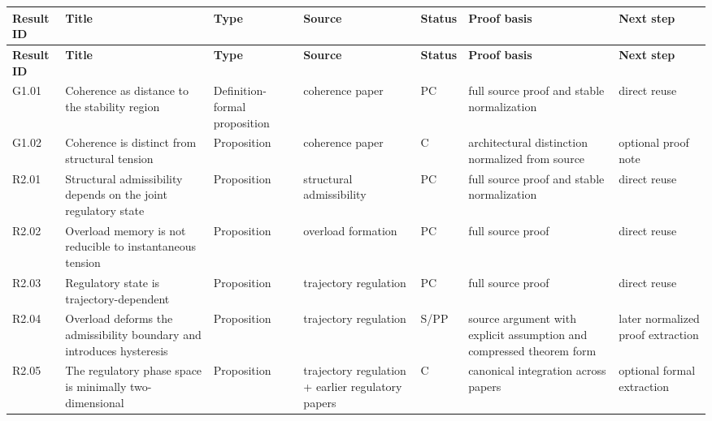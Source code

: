 \documentclass[12pt]{article}
\begin{document}
	\begin{longtable}{>{\RaggedRight\arraybackslash}p{}
			>{\RaggedRight\arraybackslash}p{}
			>{\RaggedRight\arraybackslash}p{}
			>{\RaggedRight\arraybackslash}p{}
			>{\RaggedRight\arraybackslash}p{}
			>{\RaggedRight\arraybackslash}p{}
			>{\RaggedRight\arraybackslash}p{}} 
		\toprule
		\textbf{Result ID} & \textbf{Title} & \textbf{Type} & \textbf{Source} & \textbf{Status} & \textbf{Proof basis} & \textbf{Next step} \\
		\midrule
		\endfirsthead
		\toprule
		\textbf{Result ID} & \textbf{Title} & \textbf{Type} & \textbf{Source} & \textbf{Status} & \textbf{Proof basis} & \textbf{Next step} \\
		\midrule
		\endhead
		
		G1.01 & Coherence as distance to the stability region & Definition-formal proposition & coherence paper & PC & full source proof and stable normalization & direct reuse \\
		
		G1.02 & Coherence is distinct from structural tension & Proposition & coherence paper & C & architectural distinction normalized from source & optional proof note \\
		
		R2.01 & Structural admissibility depends on the joint regulatory state & Proposition & structural admissibility & PC & full source proof and stable normalization & direct reuse \\
		
		R2.02 & Overload memory is not reducible to instantaneous tension & Proposition & overload formation & PC & full source proof & direct reuse \\
		
		R2.03 & Regulatory state is trajectory-dependent & Proposition & trajectory regulation & PC & full source proof & direct reuse \\
		
		R2.04 & Overload deforms the admissibility boundary and introduces hysteresis & Proposition & trajectory regulation & S/PP & source argument with explicit assumption and compressed theorem form & later normalized proof extraction \\
		
		R2.05 & The regulatory phase space is minimally two-dimensional & Proposition & trajectory regulation + earlier regulatory papers & C & canonical integration across papers & optional formal extraction \\
		

\end{longtable}
\end{document}

